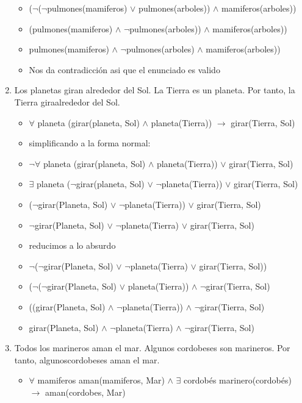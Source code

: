 \documentclass[a4paper,10pt]{article}
\begin{document}
\begin{enumerate}
\begin{itemize}
		\item ($\lnot$($\lnot$pulmones(mamiferos) $\lor$ pulmones(arboles)) $\land$ mamiferos(arboles))
		\item (pulmones(mamiferos) $\land$ $\lnot$pulmones(arboles)) $\land$ mamiferos(arboles))
		\item pulmones(mamiferos) $\land$ $\lnot$pulmones(arboles) $\land$ mamiferos(arboles))
		\item Nos da contradicción asi que el enunciado es valido
	\end{itemize}
	\item Los planetas giran alrededor del Sol. La Tierra es un planeta. Por tanto, la Tierra giraalrededor del Sol.
	\begin{itemize}
		\item $\forall$ planeta (girar(planeta, Sol) $\land$ planeta(Tierra)) $\rightarrow$ girar(Tierra, Sol)
		\item simplificando a la forma normal:
		\item $\lnot$$\forall$ planeta (girar(planeta, Sol) $\land$ planeta(Tierra)) $\lor$ girar(Tierra, Sol)
		\item $\exists$ planeta ($\lnot$girar(planeta, Sol) $\lor$ $\lnot$planeta(Tierra)) $\lor$ girar(Tierra, Sol)
		\item ($\lnot$girar(Planeta, Sol) $\lor$ $\lnot$planeta(Tierra)) $\lor$ girar(Tierra, Sol)
		\item $\lnot$girar(Planeta, Sol) $\lor$ $\lnot$planeta(Tierra) $\lor$ girar(Tierra, Sol)
		\item reducimos a lo absurdo
		\item $\lnot$($\lnot$girar(Planeta, Sol) $\lor$ $\lnot$planeta(Tierra) $\lor$ girar(Tierra, Sol))
		\item ($\lnot$($\lnot$girar(Planeta, Sol) $\lor$ planeta(Tierra)) $\land$ $\lnot$girar(Tierra, Sol)
		\item ((girar(Planeta, Sol) $\land$ $\lnot$planeta(Tierra)) $\land$ $\lnot$girar(Tierra, Sol)
		\item girar(Planeta, Sol) $\land$ $\lnot$planeta(Tierra) $\land$ $\lnot$girar(Tierra, Sol)
	\end{itemize}
	\item Todos   los   marineros   aman   el   mar.   Algunos   cordobeses   son   marineros.   Por   tanto,   algunoscordobeses aman el mar.
	\begin{itemize}
		\item $\forall$ mamiferos aman(mamiferos, Mar) $\land$ $\exists$ cordobés marinero(cordobés) $\rightarrow$ aman(cordobes, Mar)

\end{itemize}
\end{enumerate}
\end{document}
